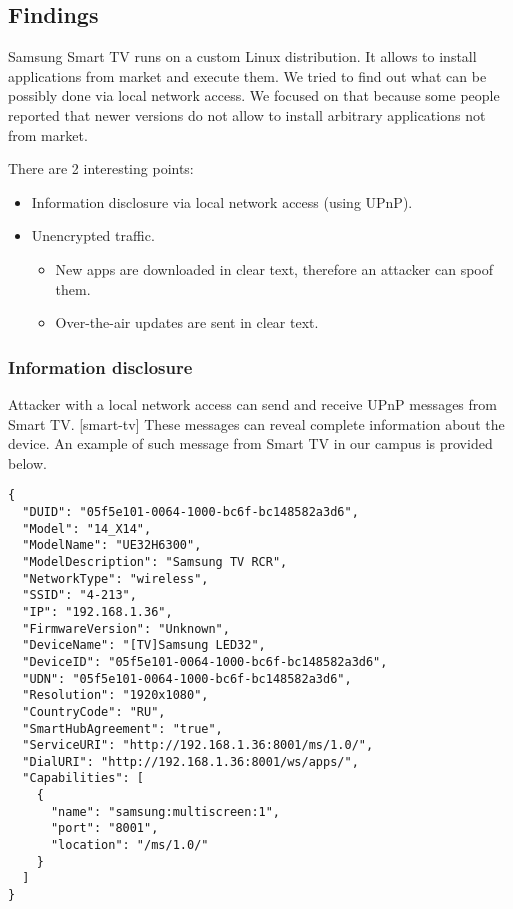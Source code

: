 \subsection{Findings}

Samsung Smart TV runs on a custom Linux distribution. It allows to install applications from market and execute them. We tried to find out what can be possibly done via local network access. We focused on that because some people reported that newer versions do not allow to install arbitrary applications not from market.

There are 2 interesting points:

\begin{itemize}
\item{}
Information disclosure via local network access (using UPnP).
\item{}
Unencrypted traffic.
\begin{itemize}
\item{}
New apps are downloaded in clear text, therefore an attacker can spoof them.
\item{}
Over-the-air updates are sent in clear text.
\end{itemize}
\end{itemize}

\subsubsection{Information disclosure}

Attacker with a local network access can send and receive UPnP messages from Smart TV. [smart-tv] These messages can reveal complete information about the device. An example of such message from Smart TV in our campus is provided below.

\begin{lstlisting}
{
  "DUID": "05f5e101-0064-1000-bc6f-bc148582a3d6",
  "Model": "14_X14",
  "ModelName": "UE32H6300",
  "ModelDescription": "Samsung TV RCR",
  "NetworkType": "wireless",
  "SSID": "4-213",
  "IP": "192.168.1.36",
  "FirmwareVersion": "Unknown",
  "DeviceName": "[TV]Samsung LED32",
  "DeviceID": "05f5e101-0064-1000-bc6f-bc148582a3d6",
  "UDN": "05f5e101-0064-1000-bc6f-bc148582a3d6",
  "Resolution": "1920x1080",
  "CountryCode": "RU",
  "SmartHubAgreement": "true",
  "ServiceURI": "http://192.168.1.36:8001/ms/1.0/",
  "DialURI": "http://192.168.1.36:8001/ws/apps/",
  "Capabilities": [
    {
      "name": "samsung:multiscreen:1",
      "port": "8001",
      "location": "/ms/1.0/"
    }
  ]
}
\end{lstlisting}

